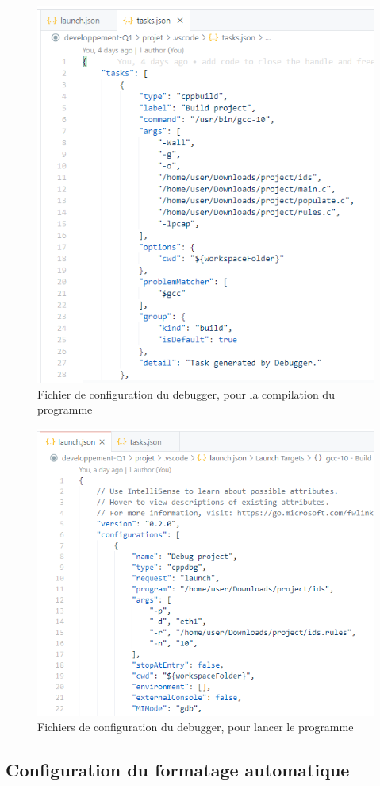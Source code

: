 \documentclass[a4paper]{article}
\begin{document}
\begin{figure}[H]
    \centering
    \includegraphics[width=0.65\linewidth]{images/task-json.PNG}
    \caption{Fichier de configuration du debugger, pour la compilation du programme}
    \label{fig:debugconfig1}
\end{figure}
\begin{figure}[H]
    \centering
    \includegraphics[width=0.70\linewidth]{images/launch-json.PNG}
    \caption{Fichiers de configuration du debugger, pour lancer le programme}
    \label{fig:debugconfig2}
\end{figure}





\subsection{Configuration du formatage automatique}
\end{document}
